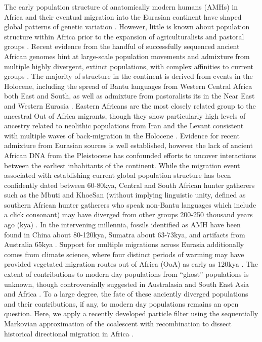 \documentclass{article}
\begin{document}
The early population structure of anatomically modern humans (AMHs) in Africa and their eventual migration into the Eurasian continent have shaped global patterns of genetic variation \cite{Pagani2016, Nielsen2017a}. However, little is known about population structure within Africa prior to the expansion of agriculturalists and pastoral groups \cite{Busby2016, Patin2017}. Recent evidence from the handful of successfully sequenced ancient African genomes hint at large-scale population movements and admixture from multiple highly divergent, extinct populations, with complex affinities to current groups \cite{Skoglund2018, Lipson2019, GallegoLlorente2015a}. The majority of structure in the continent is derived from events in the Holocene, including the spread of Bantu languages from Western Central Africa both East and South, as well as admixture from pastoralists its in the Near East and Western Eurasia \cite{Busby2016}. Eastern Africans are the most closely related group to the ancestral Out of Africa migrants, though they show particularly high levels of ancestry related to neolithic populations from Iran and the Levant consistent with multiple waves of back-migration in the Holocene \cite{Skoglund2017}.  Evidence for recent admixture from Eurasian sources is well established, however the lack of ancient African DNA from the Pleistocene has confounded efforts to uncover interactions between the earliest inhabitants of the continent. While the migration event associated with establishing current global population structure has been confidently dated between 60-80kya, Central and South African hunter gatherers such as the Mbuti and KhoeSan (without implying linguistic unity, defined as southern African hunter gatherers who speak non-Bantu languages which include a click consonant) may have diverged from other groups 200-250 thousand years ago (kya) \cite{Lipson2019, Schlebusch2017}. In the intervening millennia, fossils identified as AMH have been found in China about 80-120kya, Sumatra about 63-73kya, and artifacts from Australia 65kya \cite{Clarkson2017, Liu2015, Westaway2017}. Support for multiple migrations across Eurasia additionally comes from climate science, where four distinct periods of warming may have provided vegetated migration routes out of Africa (OoA) as early as 120kya \cite{Timmermann2016}. The extent of contributions to modern day populations from ``ghost'' populations is unknown, though controversially suggested in Australasia and South East Asia \cite{Malaspinas2016, Mallick2016, Pagani2016, Rasmussen2011, Skoglund2015} and Africa  \cite{Durvasula2019, Speidel2019, Lipson2019, Hammer2011, Plagnol2006, Ragsdale2019}. To a large degree, the fate of these anciently diverged populations and their contributions, if any, to modern day populations remains an open question. Here, we apply a recently developed particle filter using the sequentially Markovian approximation of the coalescent with recombination to dissect historical directional migration in Africa \cite{Henderson2018}. 
\end{document}
